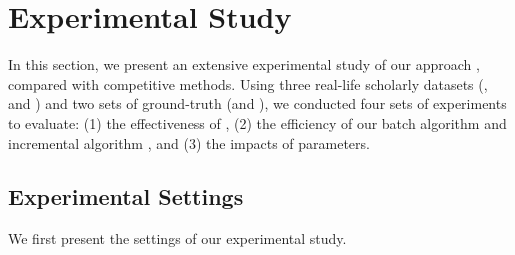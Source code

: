 \section{Experimental Study}
\label{sec-exp}

In this section, we present an extensive experimental study of our approach \ensemblerank, compared with competitive methods.
Using three real-life scholarly datasets (\aan, \aminer and \magdata) and two sets of ground-truth (\recom and \fcita), we conducted four sets of experiments to evaluate: (1) the effectiveness of \ensemblerank,
(2) the efficiency of our batch algorithm \batensemble and incremental algorithm \incensemble, and (3) the impacts of parameters. %

\subsection{Experimental Settings}

We first present the settings of our experimental study.


